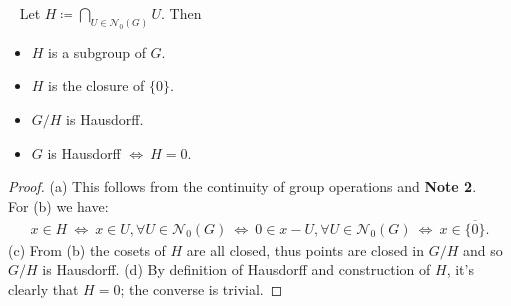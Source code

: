 \documentclass[12pt,a4paper,footinclude=true,headinclude=true]{scrbook} %
\newenvironment{lemma}[2][]
{\renewcommand\theinnercustomlemma{#2}\innercustomlemma[#1]
\begin{mdframed}[backgroundcolor=gray!20]\ }
{\end{mdframed}\endinnercustomprop}
\begin{document}
\begin{lemma}{5}
    Let $H\coloneqq\bigcap_{U\in\mathcal{N}_0(G)}U$. Then
    \begin{itemize}
        \item[(a)] $H$ is a subgroup of $G$.
        \item[(b)] $H$ is the closure of $\{0\}$.
        \item[(c)] $G/H$ is Hausdorff.
        \item[(d)] $G$ is Hausdorff $\Longleftrightarrow\ H=0$.\qquad [AM, 10.1]
    \end{itemize}
\end{lemma}
\begin{proof}
    (a) This follows from the continuity of group operations and \textbf{Note 2}. \\ For (b) we have:
    \begin{align*}
        x\in H\ \Leftrightarrow\ x\in U, \forall U\in\mathcal{N}_0(G)\ 
        \Leftrightarrow\ 0\in x-U, \forall U\in\mathcal{N}_0(G)\ \Leftrightarrow\  x\in\overline{\{0\}}.
    \end{align*}
    (c) From (b) the cosets of $H$ are all closed, thus points are closed in $G/H$ and so $G/H$ is Hausdorff. (d) By definition of Hausdorff and construction of $H$, it's clearly that $H=0$; the converse is trivial.
\end{proof}
\end{document}
